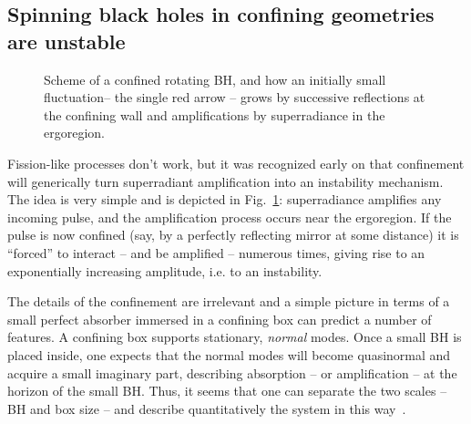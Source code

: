 \documentclass[11pt]{article}
\numberwithin{equation}{section} %
\begin{document}
\subsection{Spinning black holes in confining geometries are unstable}\label{sec:model}
%
\begin{figure}[ht]
\begin{center}
\caption{Scheme of a confined rotating BH, and how an initially small fluctuation-- the single red arrow -- grows by successive reflections at the confining wall and amplifications by superradiance in the ergoregion.
\label{fig:bhbomb}}
\end{center}
\end{figure}
%
Fission-like processes don't work, but it was recognized early on that confinement will generically turn
superradiant amplification into an instability mechanism. The idea is very simple and is depicted in Fig.~\ref{fig:bhbomb}: superradiance amplifies
any incoming pulse, and the amplification process occurs near the ergoregion. If the pulse is now confined
(say, by a perfectly reflecting mirror at some distance) it is ``forced'' to interact -- and be amplified --
numerous times, giving rise to an exponentially increasing amplitude, i.e. to an instability. 

The details of the confinement are irrelevant and a simple picture in terms of a small perfect absorber immersed in a confining box can predict a number of features. A confining box supports stationary, \emph{normal} modes. Once a small BH is placed inside, one expects that the normal modes will become quasinormal and acquire a small imaginary part, describing absorption -- or amplification -- at the horizon of the small BH. Thus, it seems that one can separate the two scales -- BH and box size -- and describe quantitatively the system in this way~\cite{Brito:2014nja}.
\end{document}

